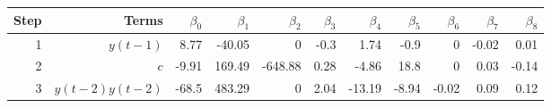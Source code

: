 \begin{tabular}{rrrrrrrrrrr}
Step & Terms & $\beta_{0}$ & $\beta_{1}$ & $\beta_{2}$ & $\beta_{3}$ & $\beta_{4}$ & $\beta_{5}$ & $\beta_{6}$ & $\beta_{7}$ & $\beta_{8}$ \\ 
\hline 
1 & $y(t-1)$ & 8.77 & -40.05 & 0 & -0.3 & 1.74 & -0.9 & 0 & -0.02 & 0.01 \\ 
2 & $c$ & -9.91 & 169.49 & -648.88 & 0.28 & -4.86 & 18.8 & 0 & 0.03 & -0.14 \\ 
3 & $y(t-2)y(t-2)$ & -68.5 & 483.29 & 0 & 2.04 & -13.19 & -8.94 & -0.02 & 0.09 & 0.12 \\ 
\hline 
\end{tabular}